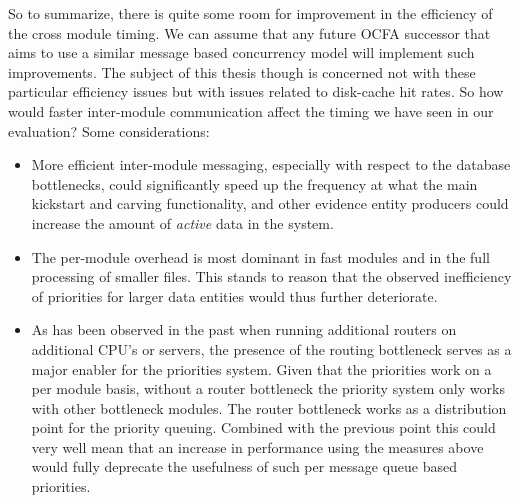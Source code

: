 So to summarize, there is quite some room for improvement in the efficiency of the cross module timing. We can assume that any future OCFA successor that aims to use a similar message based concurrency model will implement such improvements. The subject of this thesis though is concerned not with these particular efficiency issues but with issues related to disk-cache hit rates. So how would faster inter-module communication affect the timing we have seen in our evaluation? Some considerations:
\begin{itemize}
\item More efficient inter-module messaging, especially with respect to the database bottlenecks, could significantly speed up the frequency at what the main kickstart and carving functionality, and other evidence entity producers could increase the amount of \emph{active} data in the system. 
\item The per-module overhead is most dominant in fast modules and in the full processing of smaller files. This stands to reason that the observed inefficiency of priorities for larger data entities would thus further deteriorate.
\item As has been observed in the past when running additional routers on additional CPU's or servers, the presence of the routing bottleneck serves as a major enabler for the priorities system. Given that the priorities work on a per module basis, without a router bottleneck the priority system only works with other bottleneck modules. The router bottleneck works as a distribution point for the priority queuing. Combined with the previous point this could very well mean that an increase in performance using the measures above would fully deprecate the usefulness of such per message queue based priorities. 
\end{itemize}
